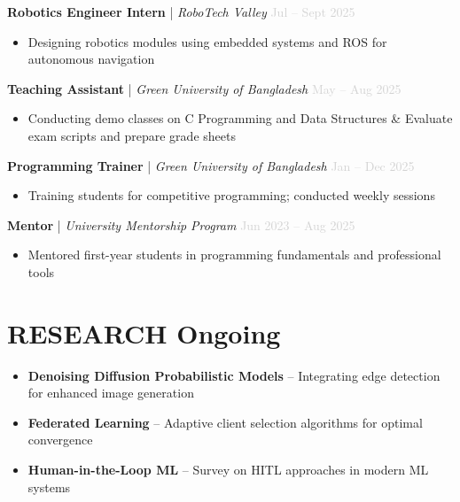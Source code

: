 \documentclass[a4paper,10pt]{article}
\begin{document}
\textbf{Robotics Engineer Intern} | \textit{RoboTech Valley} \hfill \textcolor{lightgray}{Jul -- Sept 2025}
\begin{itemize}
    \item Designing robotics modules using embedded systems and ROS for autonomous navigation
\end{itemize}

\textbf{Teaching Assistant} | \textit{Green University of Bangladesh} \hfill \textcolor{lightgray}{May -- Aug 2025}
\begin{itemize}
    \item Conducting demo classes on C Programming and Data Structures \& Evaluate exam scripts and prepare grade sheets
\end{itemize}

\textbf{Programming Trainer} | \textit{Green University of Bangladesh} \hfill \textcolor{lightgray}{Jan -- Dec 2025}
\begin{itemize}
    \item Training students for competitive programming; conducted weekly sessions
\end{itemize}

\textbf{Mentor} | \textit{University Mentorship Program} \hfill \textcolor{lightgray}{Jun 2023 -- Aug 2025}
\begin{itemize}
    \item Mentored first-year students in programming fundamentals and professional tools
\end{itemize}

\vspace{0.1cm}

\section*{RESEARCH Ongoing }
\begin{itemize}
    \item \textbf{Denoising Diffusion Probabilistic Models} -- Integrating edge detection for enhanced image generation
    \item \textbf{Federated Learning} -- Adaptive client selection algorithms for optimal convergence
    \item \textbf{Human-in-the-Loop ML} -- Survey on HITL approaches in modern ML systems
\end{itemize}

\vspace{-0.1cm}
\end{document}
